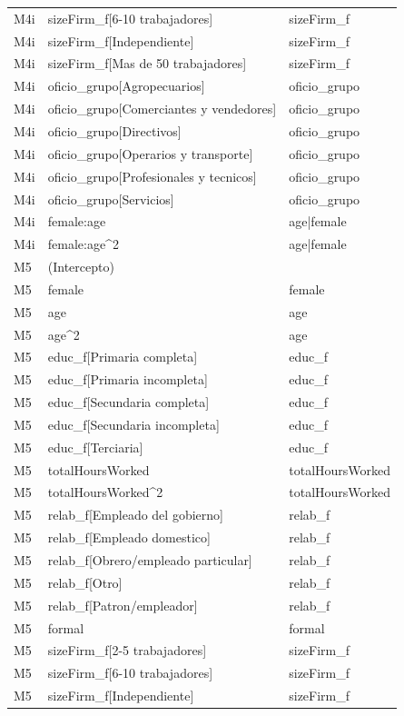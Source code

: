\begin{longtable}{lll}
M4i & sizeFirm\_f[6-10 trabajadores] & sizeFirm\_f \\
M4i & sizeFirm\_f[Independiente] & sizeFirm\_f \\
M4i & sizeFirm\_f[Mas de 50 trabajadores] & sizeFirm\_f \\
M4i & oficio\_grupo[Agropecuarios] & oficio\_grupo \\
M4i & oficio\_grupo[Comerciantes y vendedores] & oficio\_grupo \\
M4i & oficio\_grupo[Directivos] & oficio\_grupo \\
M4i & oficio\_grupo[Operarios y transporte] & oficio\_grupo \\
M4i & oficio\_grupo[Profesionales y tecnicos] & oficio\_grupo \\
M4i & oficio\_grupo[Servicios] & oficio\_grupo \\
M4i & female:age & age|female \\
M4i & female:age\textasciicircum 2 & age|female \\
M5 & (Intercepto) &  \\
M5 & female & female \\
M5 & age & age \\
M5 & age\textasciicircum 2 & age \\
M5 & educ\_f[Primaria completa] & educ\_f \\
M5 & educ\_f[Primaria incompleta] & educ\_f \\
M5 & educ\_f[Secundaria completa] & educ\_f \\
M5 & educ\_f[Secundaria incompleta] & educ\_f \\
M5 & educ\_f[Terciaria] & educ\_f \\
M5 & totalHoursWorked & totalHoursWorked \\
M5 & totalHoursWorked\textasciicircum 2 & totalHoursWorked \\
M5 & relab\_f[Empleado del gobierno] & relab\_f \\
M5 & relab\_f[Empleado domestico] & relab\_f \\
M5 & relab\_f[Obrero/empleado particular] & relab\_f \\
M5 & relab\_f[Otro] & relab\_f \\
M5 & relab\_f[Patron/empleador] & relab\_f \\
M5 & formal & formal \\
M5 & sizeFirm\_f[2-5 trabajadores] & sizeFirm\_f \\
M5 & sizeFirm\_f[6-10 trabajadores] & sizeFirm\_f \\
M5 & sizeFirm\_f[Independiente] & sizeFirm\_f \\

\end{longtable}
